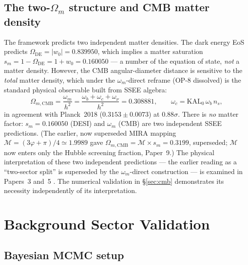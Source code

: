 \documentclass[12pt,a4paper]{article}
\newcommand{\phiG}{\varphi}
\newcommand{\MIRA}{\mathcal{M}}
\newcommand{\Omde}{\Omega_{\mathrm{DE}}}
\newcommand{\sm}{s_m}
\newcommand{\OmmCMB}{\Omega_{m,\mathrm{CMB}}}
\newcommand{\wz}{w_0}
\begin{document}
\subsection{The two-$\Omega_m$ structure and CMB matter density}
\label{sec:mira}

The framework predicts two independent matter densities.
The dark energy EoS predicts $\Omde = |{\wz}| = 0.839950$, which implies a
matter saturation $\sm = 1 - \Omde = 1 + w_0 = 0.160050$ --- a number of the
equation of state, \emph{not} a matter density.
However, the CMB angular-diameter distance is sensitive to the
\textit{total} matter density, which under the $\omega_m$-direct reframe
(OP-8 dissolved) is the standard physical observable built from SSEE algebra:
\begin{equation}
  \OmmCMB = \frac{\omega_m}{h^2}
          = \frac{\omega_b+\omega_c+\omega_\nu}{h^2} = 0.308881,
  \qquad \omega_c=\mathrm{KAL_0}\,\omega_b\,n_s,
  \label{eq:omega_m_direct}
\end{equation}
in agreement with Planck~2018 ($0.3153\pm 0.0073$) at $0.88\sigma$. There is
\emph{no} matter factor: $\sm=0.160050$ (DESI) and $\omega_m$ (CMB) are two
independent SSEE predictions. (The earlier, now superseded MIRA mapping
$\MIRA=(3\phiG+\pi)/4\simeq1.9989$ gave $\OmmCMB=\MIRA\times\sm=0.3199$, superseded;
$\MIRA$ now enters only the Hubble screening fraction, Paper~9.)
The physical interpretation of these two independent predictions --- the
earlier reading as a ``two-sector split'' is superseded by the
$\omega_m$-direct construction --- is examined in Papers~3 and~5 \citep{AlmeidaSSEE2026P3,AlmeidaSSEE2026P5}.
The numerical validation in \S\ref{sec:cmb} demonstrates its necessity
independently of its interpretation.


\section{Background Sector Validation}
\label{sec:background}

\subsection{Bayesian MCMC setup}
\label{sec:mcmc_setup}
\end{document}
